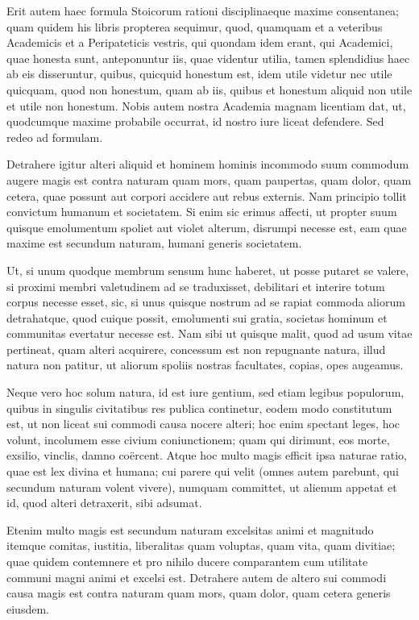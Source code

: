  Erit autem haec formula Stoicorum rationi disciplinaeque maxime consentanea; quam quidem his libris propterea sequimur, quod, quamquam et a veteribus Academicis et a Peripateticis vestris, qui quondam idem erant, qui Academici, quae honesta sunt, anteponuntur iis, quae videntur utilia, tamen splendidius haec ab eis disseruntur, quibus, quicquid honestum est, idem utile videtur nec utile quicquam, quod non honestum, quam ab iis, quibus et honestum aliquid non utile et utile non honestum. Nobis autem nostra Academia magnam licentiam dat, ut, quodcumque maxime probabile occurrat, id nostro iure liceat defendere. Sed redeo ad formulam.

 Detrahere igitur alteri aliquid et hominem hominis incommodo suum commodum augere magis est contra naturam quam mors, quam paupertas, quam dolor, quam cetera, quae possunt aut corpori accidere aut rebus externis. Nam principio tollit convictum humanum et societatem. Si enim sic erimus affecti, ut propter suum quisque emolumentum spoliet aut violet alterum, disrumpi necesse est, eam quae maxime est secundum naturam, humani generis societatem.

 Ut, si unum quodque membrum sensum hunc haberet, ut posse putaret se valere, si proximi membri valetudinem ad se traduxisset, debilitari et interire totum corpus necesse esset, sic, si unus quisque nostrum ad se rapiat commoda aliorum detrahatque, quod cuique possit, emolumenti sui gratia, societas hominum et communitas evertatur necesse est. Nam sibi ut quisque malit, quod ad usum vitae pertineat, quam alteri acquirere, concessum est non repugnante natura, illud natura non patitur, ut aliorum spoliis nostras facultates, copias, opes augeamus.

 Neque vero hoc solum natura, id est iure gentium, sed etiam legibus populorum, quibus in singulis civitatibus res publica continetur, eodem modo constitutum est, ut non liceat sui commodi causa nocere alteri; hoc enim spectant leges, hoc volunt, incolumem esse civium coniunctionem; quam qui dirimunt, eos morte, exsilio, vinclis, damno coërcent. Atque hoc multo magis efficit ipsa naturae ratio, quae est lex divina et humana; cui parere qui velit (omnes autem parebunt, qui secundum naturam volent vivere), numquam committet, ut alienum appetat et id, quod alteri detraxerit, sibi adsumat.

 Etenim multo magis est secundum naturam excelsitas animi et magnitudo itemque comitas, iustitia, liberalitas quam voluptas, quam vita, quam divitiae; quae quidem contemnere et pro nihilo ducere comparantem cum utilitate communi magni animi et excelsi est. Detrahere autem de altero sui commodi causa magis est contra naturam quam mors, quam dolor, quam cetera generis eiusdem.


